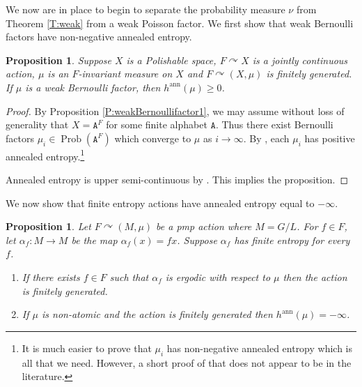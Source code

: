 \documentclass[11pt]{amsart}
\newtheorem{proposition}[theorem]{Proposition}
\theoremstyle{definition}
\theoremstyle{remark}
\newcommand{\ann}{\operatorname{ann}}
\newcommand{\Prob}{\operatorname{Prob}}
\def\cc{{\curvearrowright}}
\begin{document}
We now are in place to begin to separate the probability measure $\nu$ from Theorem \ref{T:weak} from a weak Poisson factor.  We first show that weak Bernoulli factors have non-negative annealed entropy.

\begin{proposition}\label{P:nonnegative}
Suppose $X$ is a Polishable space, $F \cc X$ is a jointly continuous action, $\mu$ is an $F$-invariant measure on $X$ and $F \cc (X,\mu)$ is finitely generated. If $\mu$ is a weak Bernoulli factor, then $h^{\ann}(\mu) \ge 0$.
\end{proposition}

\begin{proof}
By Proposition \ref{P:weakBernoullifactor1}, we may assume without loss of generality that $X=\mathtt{A}^F$ for some finite alphabet $\mathtt{A}$.  Thus there exist Bernoulli factors $\mu_i \in \Prob(\mathtt{A}^F)$ which converge to $\mu$ as $i\to\infty$. By \cite[Theorem 3.2]{kerr-cpe}, each $\mu_i$ has positive annealed entropy.\footnote{It is much easier to prove that $\mu_i$ has non-negative annealed entropy which is all that we need. However, a short proof of that does not appear to be in the literature.} 


Annealed entropy is upper semi-continuous by \cite{MR2630067}. This implies the proposition.
\end{proof}


We now show that finite entropy actions have annealed entropy equal to $- \infty$.

\begin{proposition}\label{P:smoothactions}
Let $F \cc (M,\mu)$ be a pmp action where $M = G/L$. For $f \in F$, let $\alpha_f:M \to M$ be the map $\alpha_f(x)=fx$. Suppose $\alpha_f$ has finite entropy for every $f$.
    \begin{enumerate}
        \item If there exists $f \in F$ such that $\alpha_f$ is ergodic with respect to $\mu$ then the action is finitely generated.
        \item   If $\mu$ is non-atomic and the action is finitely generated then $h^{\ann}(\mu)=-\infty$. 
    \end{enumerate}
    
  
\end{proposition}
\end{document}
